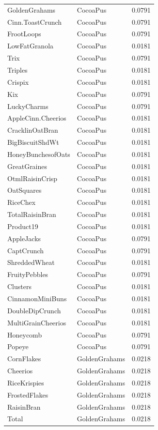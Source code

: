 \begin{longtable}{llr}
GoldenGrahams & CocoaPus & 0.0791 \\
Cinn.ToastCrunch & CocoaPus & 0.0791 \\
FrootLoops & CocoaPus & 0.0791 \\
LowFatGranola & CocoaPus & 0.0181 \\
Trix & CocoaPus & 0.0791 \\
Triples & CocoaPus & 0.0181 \\
Crispix & CocoaPus & 0.0181 \\
Kix & CocoaPus & 0.0791 \\
LuckyCharms & CocoaPus & 0.0791 \\
AppleCinn.Cheerios & CocoaPus & 0.0181 \\
CracklinOatBran & CocoaPus & 0.0181 \\
BigBiscuitShdWt & CocoaPus & 0.0181 \\
HoneyBunchesofOats & CocoaPus & 0.0181 \\
GreatGraines & CocoaPus & 0.0181 \\
OtmlRaisinCrisp & CocoaPus & 0.0181 \\
OatSquares & CocoaPus & 0.0181 \\
RiceChex & CocoaPus & 0.0181 \\
TotalRaisinBran & CocoaPus & 0.0181 \\
Product19 & CocoaPus & 0.0181 \\
AppleJacks & CocoaPus & 0.0791 \\
CaptCrunch & CocoaPus & 0.0791 \\
ShreddedWheat & CocoaPus & 0.0181 \\
FruityPebbles & CocoaPus & 0.0791 \\
Clusters & CocoaPus & 0.0181 \\
CinnamonMiniBuns & CocoaPus & 0.0181 \\
DoubleDipCrunch & CocoaPus & 0.0181 \\
MultiGrainCheerios & CocoaPus & 0.0181 \\
Honeycomb & CocoaPus & 0.0791 \\
Popeye & CocoaPus & 0.0791 \\
CornFlakes & GoldenGrahams & 0.0218 \\
Cheerios & GoldenGrahams & 0.0218 \\
RiceKrispies & GoldenGrahams & 0.0218 \\
FrostedFlakes & GoldenGrahams & 0.0218 \\
RaisinBran & GoldenGrahams & 0.0218 \\
Total & GoldenGrahams & 0.0218 \\

\end{longtable}
